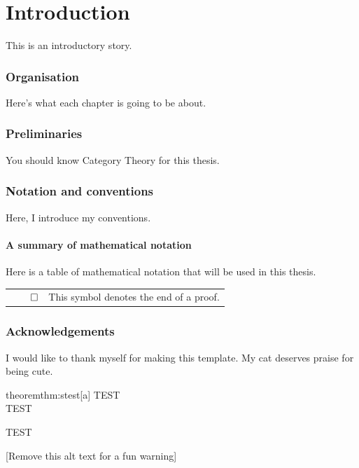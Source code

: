 \documentclass{scripts/preamble}
\begin{document}
	\chapter*{Introduction}
	This is an introductory story.
	\clearpage
	\subsection*{Organisation}
	Here's what each chapter is going to be about.
	\subsection*{Preliminaries}
	You should know Category Theory for this thesis\cite{rudin_principles_1976}.
	\subsection*{Notation and conventions}
	Here, I introduce my conventions.
	\subsubsection*{A summary of mathematical notation}
    Here is a table of mathematical notation that will be used in this thesis.\\
	{\renewcommand\tabularxcolumn[1]{m{#1}}
	\renewcommand{\arraystretch}{1.5}
	\begin{tabularx}{\textwidth}{ c X }
		\(\qed\)\index[notation]{\(\qed\)} & This symbol denotes the end of a proof.
	\end{tabularx}}
	\subsection*{Acknowledgements}
	I would like to thank myself for making this template. My cat deserves praise for being cute.
	\begin{makethm}{theorem}{thm:stest}[a]
		TEST\\TEST\par TEST
	\end{makethm}
	[Remove this alt text for a fun warning]
\end{document}
